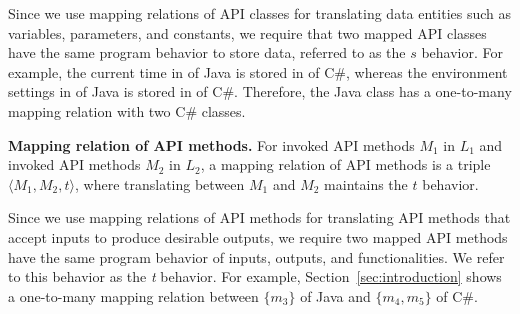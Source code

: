 Since we use mapping relations of API classes for translating data entities such as
variables, parameters, and constants, we require that two mapped
API classes have the same program behavior to store data, referred to as
the $s$ behavior. For example, the current time in  of Java
is stored in  of C\#, whereas the
environment settings in  of Java is stored in
 of C\#. Therefore, the Java class has a
one-to-many mapping relation with two C\# classes.



%

\textbf{Mapping relation of API methods.} For invoked API methods
$M_1$ in $L_1$ and invoked API methods $M_2$ in
$L_2$, a mapping relation of API methods is a triple
$\langle M_1, M_2, t \rangle$, where translating between $M_1$ and $M_2$ maintains the $t$ behavior.

Since we use mapping relations of API methods for translating API methods
that accept inputs to produce desirable outputs, we require two
mapped API methods have the same program behavior of inputs, outputs, and
functionalities. We refer to this behavior as the \emph{t} behavior. For example, Section~\ref{sec:introduction} shows a one-to-many mapping relation between $\{m_3\}$ of Java and $\{m_4, m_5\}$ of C\#. 